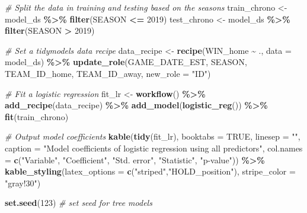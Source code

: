 \documentclass[
  12pt,
  a4paper,
]{article}
\newenvironment{Shaded}{\begin{snugshade}}{\end{snugshade}}
\newcommand{\AttributeTok}[1]{\textcolor[rgb]{0.13,0.29,0.53}{#1}}
\newcommand{\CommentTok}[1]{\textcolor[rgb]{0.56,0.35,0.01}{\textit{#1}}}
\newcommand{\ConstantTok}[1]{\textcolor[rgb]{0.56,0.35,0.01}{#1}}
\newcommand{\DecValTok}[1]{\textcolor[rgb]{0.00,0.00,0.81}{#1}}
\newcommand{\FunctionTok}[1]{\textcolor[rgb]{0.13,0.29,0.53}{\textbf{#1}}}
\newcommand{\NormalTok}[1]{#1}
\newcommand{\OtherTok}[1]{\textcolor[rgb]{0.56,0.35,0.01}{#1}}
\newcommand{\SpecialCharTok}[1]{\textcolor[rgb]{0.81,0.36,0.00}{\textbf{#1}}}
\newcommand{\StringTok}[1]{\textcolor[rgb]{0.31,0.60,0.02}{#1}}
\begin{document}
\begin{Shaded}
\begin{Highlighting}[]
\CommentTok{\# Split the data in training and testing based on the seasons}
\NormalTok{train\_chrono }\OtherTok{\textless{}{-}}\NormalTok{ model\_ds }\SpecialCharTok{\%\textgreater{}\%}
  \FunctionTok{filter}\NormalTok{(SEASON }\SpecialCharTok{\textless{}=} \DecValTok{2019}\NormalTok{)}
\NormalTok{test\_chrono }\OtherTok{\textless{}{-}}\NormalTok{ model\_ds }\SpecialCharTok{\%\textgreater{}\%}
  \FunctionTok{filter}\NormalTok{(SEASON }\SpecialCharTok{\textgreater{}} \DecValTok{2019}\NormalTok{)}

\CommentTok{\# Set a tidymodels data recipe}
\NormalTok{data\_recipe }\OtherTok{\textless{}{-}} \FunctionTok{recipe}\NormalTok{(WIN\_home }\SpecialCharTok{\textasciitilde{}}\NormalTok{ ., }\AttributeTok{data =}\NormalTok{ model\_ds) }\SpecialCharTok{\%\textgreater{}\%}
  \FunctionTok{update\_role}\NormalTok{(GAME\_DATE\_EST, SEASON,}
\NormalTok{              TEAM\_ID\_home, TEAM\_ID\_away,}
              \AttributeTok{new\_role =} \StringTok{"ID"}\NormalTok{)}

\CommentTok{\# Fit a logistic regression}
\NormalTok{fit\_lr }\OtherTok{\textless{}{-}} \FunctionTok{workflow}\NormalTok{() }\SpecialCharTok{\%\textgreater{}\%}
  \FunctionTok{add\_recipe}\NormalTok{(data\_recipe) }\SpecialCharTok{\%\textgreater{}\%}
  \FunctionTok{add\_model}\NormalTok{(}\FunctionTok{logistic\_reg}\NormalTok{()) }\SpecialCharTok{\%\textgreater{}\%}
  \FunctionTok{fit}\NormalTok{(train\_chrono)}

\CommentTok{\# Output model coefficients}
\FunctionTok{kable}\NormalTok{(}\FunctionTok{tidy}\NormalTok{(fit\_lr), }\AttributeTok{booktabs =} \ConstantTok{TRUE}\NormalTok{, }\AttributeTok{linesep =} \StringTok{""}\NormalTok{,}
      \AttributeTok{caption =} \StringTok{"Model coefficients of}
\StringTok{                 logistic regression using all predictors"}\NormalTok{,}
      \AttributeTok{col.names =} \FunctionTok{c}\NormalTok{(}\StringTok{"Variable"}\NormalTok{,}
                    \StringTok{"Coefficient"}\NormalTok{,}
                    \StringTok{"Std. error"}\NormalTok{,}
                    \StringTok{"Statistic"}\NormalTok{,}
                    \StringTok{"p{-}value"}\NormalTok{)) }\SpecialCharTok{\%\textgreater{}\%}
  \FunctionTok{kable\_styling}\NormalTok{(}\AttributeTok{latex\_options =} \FunctionTok{c}\NormalTok{(}\StringTok{"striped"}\NormalTok{,}\StringTok{"HOLD\_position"}\NormalTok{),}
                \AttributeTok{stripe\_color =} \StringTok{"gray!30"}\NormalTok{)}

\FunctionTok{set.seed}\NormalTok{(}\DecValTok{123}\NormalTok{) }\CommentTok{\# set seed for tree models}


\end{Highlighting}
\end{Shaded}
\end{document}

